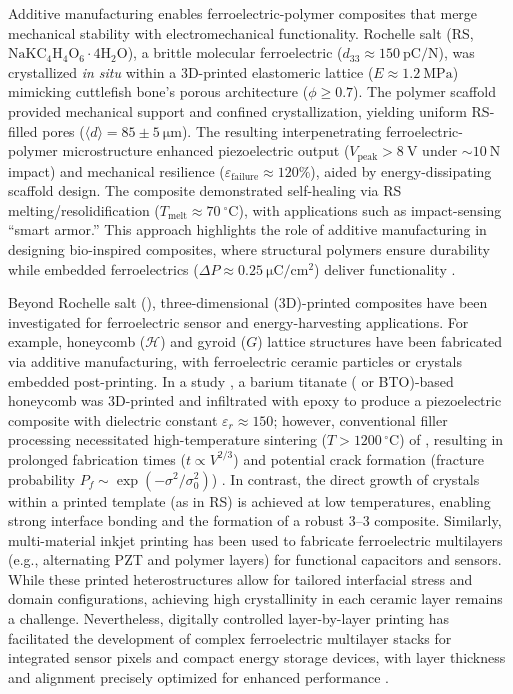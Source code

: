 \documentclass[a4paper,fleqn]{cas-sc}
\begin{document}
\par Additive manufacturing enables ferroelectric-polymer composites that merge mechanical stability with electromechanical functionality. Rochelle salt (RS, $\mathrm{NaKC_4H_4O_6 \cdot 4H_2O}$), a brittle molecular ferroelectric ($d_{33} \approx 150\ \mathrm{pC/N}$), was crystallized \textit{in situ} within a 3D-printed elastomeric lattice ($E \approx 1.2\ \mathrm{MPa}$) mimicking cuttlefish bone's porous architecture ($\phi \geq 0.7$). The polymer scaffold provided mechanical support and confined crystallization, yielding uniform RS-filled pores ($\langle d \rangle = 85 \pm 5\ \mathrm{\mu m}$). The resulting interpenetrating ferroelectric-polymer microstructure enhanced piezoelectric output ($V_{\mathrm{peak}} > 8\ \mathrm{V}$ under $\sim 10\ \mathrm{N}$ impact) and mechanical resilience ($\varepsilon_{\mathrm{failure}} \approx 120\%$), aided by energy-dissipating scaffold design. The composite demonstrated self-healing via RS melting/resolidification ($T_{\mathrm{melt}} \approx 70\ \mathrm{^\circ C}$), with applications such as impact-sensing ``smart armor.'' This approach highlights the role of additive manufacturing in designing bio-inspired composites, where structural polymers ensure durability while embedded ferroelectrics ($\Delta P \approx 0.25\ \mathrm{\mu C/cm^2}$) deliver functionality \cite{He2023}.
\par Beyond Rochelle salt (), three-dimensional (3D)-printed composites have been investigated for ferroelectric sensor and energy-harvesting applications. For example, honeycomb ($\mathcal{H}$) and gyroid ($G$) lattice structures have been fabricated via additive manufacturing, with ferroelectric ceramic particles or crystals embedded post-printing. In a study \cite{Zeng2020}, a barium titanate ( or BTO)-based honeycomb was 3D-printed and infiltrated with epoxy to produce a piezoelectric composite with dielectric constant $\varepsilon_r \approx 150$; however, conventional filler processing necessitated high-temperature sintering ($T > 1200\,^{\circ}\mathrm{C}$) of , resulting in prolonged fabrication times ($t \propto V^{2/3}$) and potential crack formation (fracture probability $P_f \sim \exp(-\sigma^2/\sigma_0^2)$) \cite{He2023}. In contrast, the direct growth of crystals within a printed template (as in RS) is achieved at low temperatures, enabling strong interface bonding and the formation of a robust 3–3 composite. Similarly, multi-material inkjet printing has been used to fabricate ferroelectric multilayers (e.g., alternating PZT and polymer layers) for functional capacitors and sensors. While these printed heterostructures allow for tailored interfacial stress and domain configurations, achieving high crystallinity in each ceramic layer remains a challenge. Nevertheless, digitally controlled layer-by-layer printing has facilitated the development of complex ferroelectric multilayer stacks for integrated sensor pixels and compact energy storage devices, with layer thickness and alignment precisely optimized for enhanced performance \cite{Pramanick2025}.
\end{document}

